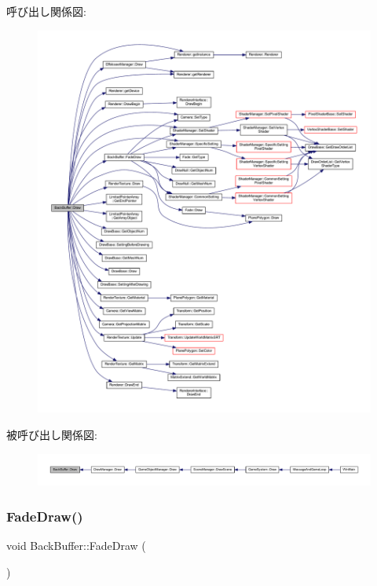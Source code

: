 呼び出し関係図\+:
\nopagebreak
\begin{figure}[H]
\begin{center}
\leavevmode
\includegraphics[width=350pt]{class_back_buffer_adb51191c002489e4faac54199449e9ef_cgraph}
\end{center}
\end{figure}
被呼び出し関係図\+:
\nopagebreak
\begin{figure}[H]
\begin{center}
\leavevmode
\includegraphics[width=350pt]{class_back_buffer_adb51191c002489e4faac54199449e9ef_icgraph}
\end{center}
\end{figure}
\mbox{\label{class_back_buffer_a9835a5db9850f774a382c4f8e611b1d1}} 
\subsubsection{\texorpdfstring{Fade\+Draw()}{FadeDraw()}}
{\footnotesize\ttfamily void Back\+Buffer\+::\+Fade\+Draw (\begin{DoxyParamCaption}{ }\end{DoxyParamCaption})\hspace{0.3cm}{\ttfamily [private]}}



